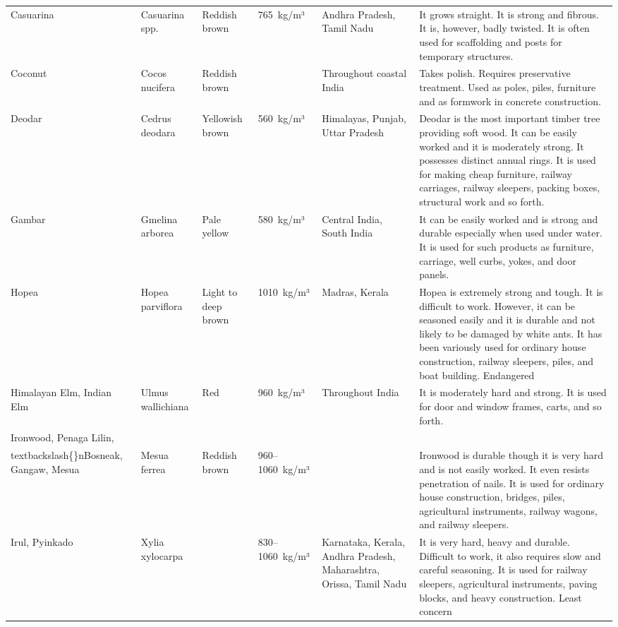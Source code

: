 \documentclass{article}
\begin{document}
\begin{tabular}{llllll}
Casuarina & Casuarina spp. & Reddish brown & 765 kg/m³ & Andhra Pradesh, Tamil Nadu & It grows straight. It is strong and fibrous. It is, however, badly twisted. It is often used for scaffolding and posts for temporary structures. \\
Coconut & Cocos nucifera & Reddish brown &  & Throughout coastal India & Takes polish. Requires preservative treatment. Used as poles, piles, furniture and as formwork in concrete construction. \\
Deodar & Cedrus deodara & Yellowish brown & 560 kg/m³ & Himalayas, Punjab, Uttar Pradesh & Deodar is the most important timber tree providing soft wood. It can be easily worked and it is moderately strong. It possesses distinct annual rings. It is used for making cheap furniture, railway carriages, railway sleepers, packing boxes, structural work and so forth. \\
Gambar & Gmelina arborea & Pale yellow & 580 kg/m³ & Central India, South India & It can be easily worked and is strong and durable especially when used under water. It is used for such products as furniture, carriage, well curbs, yokes, and door panels. \\
Hopea & Hopea parviflora & Light to deep brown & 1010 kg/m³ & Madras, Kerala & Hopea is extremely strong and tough. It is difficult to work. However, it can be seasoned easily and it is durable and not likely to be damaged by white ants. It has been variously used for ordinary house construction, railway sleepers, piles, and boat building. Endangered \\
Himalayan Elm, Indian Elm & Ulmus wallichiana & Red & 960 kg/m³ & Throughout India & It is moderately hard and strong. It is used for door and window frames, carts, and so forth. \\
Ironwood, Penaga Lilin,\\textbackslash\{\}nBosneak, Gangaw, Mesua & Mesua ferrea & Reddish brown & 960–1060 kg/m³ &  & Ironwood is durable though it is very hard and is not easily worked. It even resists penetration of nails. It is used for ordinary house construction, bridges, piles, agricultural instruments, railway wagons, and railway sleepers. \\
Irul, Pyinkado & Xylia xylocarpa &  & 830–1060 kg/m³ & Karnataka, Kerala, Andhra Pradesh, Maharashtra, Orissa, Tamil Nadu & It is very hard, heavy and durable. Difficult to work, it also requires slow and careful seasoning. It is used for railway sleepers, agricultural instruments, paving blocks, and heavy construction. Least concern \\

\end{tabular}
\end{document}

